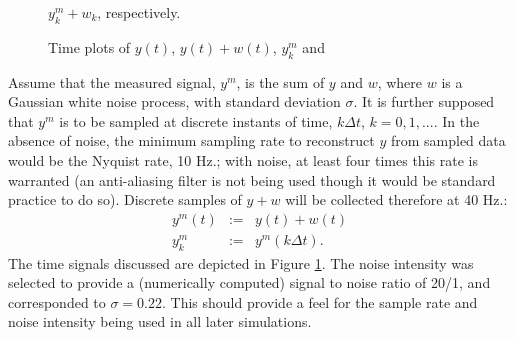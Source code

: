 \begin{figure}[hbt]
\centerline{}
\smallskip
\small
\caption{\small Time plots of $y(t)$, $y(t) + w(t)$, $y^m_k$ and}
$y^m_k + w_k$, respectively.
\label{signals}
\end{figure}


Assume that the measured signal, $y^m$, is the sum of $y$ and $w$, where $w$ is a
Gaussian white noise process, with standard deviation $\sigma$.  
It is further supposed that
$y^m$ is to be sampled at discrete instants of time,
$k \Delta t$, $k = 0, 1, ...$.  In the absence of noise, the minimum sampling rate 
to reconstruct $y$ from sampled data would be the Nyquist rate, 10 Hz.; with
noise,
at least four times this rate is warranted (an anti-aliasing filter is not
being used
though it would be standard practice to do so).
Discrete samples of $y + w$ will be collected therefore
at 40 Hz.:
\begin{eqnarray}
y^m(t) &:=& y(t) + w(t) \\
y^m_k & :=& y^m(k \Delta t). \nonumber
\label{ysampled}
\end{eqnarray}
The time signals discussed are depicted in Figure \ref{signals}.  The noise
intensity was selected to provide a (numerically computed)
signal to noise ratio of 20/1, and
corresponded to $\sigma = 0.22$. This should 
provide a feel for the sample rate and noise intensity being used in all later
simulations.


